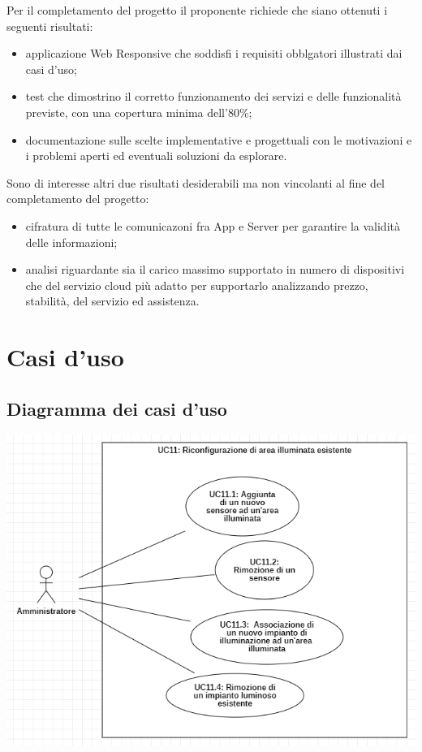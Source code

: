 \documentclass[a4paper, 12pt]{article}
\begin{document}
Per il completamento del progetto il proponente richiede che siano ottenuti i
seguenti risultati:
\begin{itemize}
    \item applicazione Web Responsive che soddisfi i requisiti obblgatori
    illustrati dai casi d'uso;
    \item test che dimostrino il corretto funzionamento dei servizi e delle
    funzionalità previste, con una copertura minima dell'80\%;
    \item documentazione sulle scelte implementative e progettuali con le
    motivazioni e i problemi aperti ed eventuali soluzioni da esplorare.
\end{itemize}
Sono di interesse altri due risultati desiderabili ma non vincolanti al fine del
completamento del progetto:
\begin{itemize}
    \item cifratura di tutte le comunicazoni fra App e Server per garantire la
    validità delle informazioni;
    \item analisi riguardante sia il carico massimo supportato in numero di
    dispositivi che del servizio cloud più adatto per supportarlo
    analizzando prezzo, stabilità, del servizio ed assistenza.
\end{itemize} 
\newpage
\section{Casi d'uso}

\subsection{Diagramma dei casi d'uso}

\includegraphics[scale=0.7]{diagramma_use_case_4.png}
\end{document}
